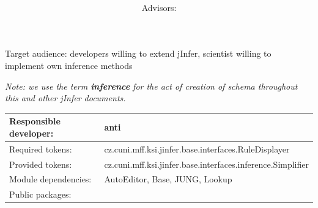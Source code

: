 \documentclass[a4paper,10pt,oneside]{article}
\title{\bf\mftitle}
\author{\mfauthor \\ Advisors: \mfadvisor}
\date{\mfplacedate}
\begin{document}
\maketitle
\noindent Target audience: developers willing to extend jInfer, scientist willing to implement own inference methods

\noindent \emph{Note: we use the term \textbf{inference} for the act of creation of schema throughout this and other jInfer documents.}

\noindent \begin{tabular}{|l|l|} \hline
Responsible developer: & anti \\ \hline
Required tokens:       & cz.cuni.mff.ksi.jinfer.base.interfaces.RuleDisplayer \\ \hline
Provided tokens:       & cz.cuni.mff.ksi.jinfer.base.interfaces.inference.Simplifier \\ \hline
Module dependencies:   & AutoEditor, Base, JUNG, Lookup \\ \hline
Public packages:       & \\ \hline
\end{tabular}
\end{document}
